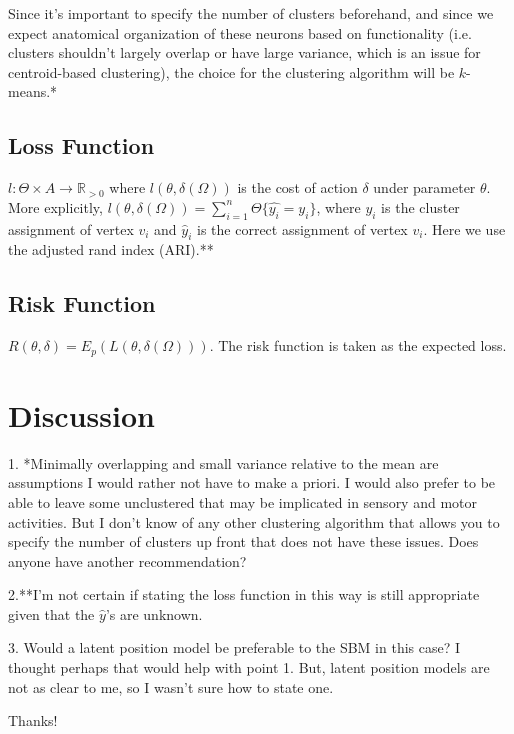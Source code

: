 \documentclass[psamsfonts]{amsart}
\theoremstyle{definition}
\theoremstyle{remark}
\numberwithin{equation}{section}
\begin{document}
Since it's important to specify the number of clusters beforehand, and since we expect anatomical organization of these neurons based on functionality (i.e. clusters shouldn't largely overlap or have large variance, which is an issue for centroid-based clustering), the choice for the clustering algorithm will be $k$-means.* 
\subsection{Loss Function}
$l : \Theta \times A \to \mathbb R_{> 0} $ where $l(\theta,\delta(\Omega))$ is the cost of action $\delta$ under parameter $\theta$. More explicitly, $l(\theta, \delta(\Omega)) = \sum_{i = 1}^n \Theta \{\hat{y_i} = y_i\}$, where $y_i$ is the cluster assignment of vertex $v_i$ and $\hat{y}_i$ is the correct assignment of vertex $v_i$. Here we use the adjusted rand index (ARI).**
\subsection{Risk Function}
$R(\theta, \delta) = E_{p}(L(\theta,\delta(\Omega)))$. The risk function is taken as the expected loss.


\section{Discussion}
1. *Minimally overlapping and small variance relative to the mean are assumptions I would rather not have to make a priori. I would also prefer to be able to leave some unclustered that may be implicated in sensory and motor activities. But I don't know of any other clustering algorithm that allows you to specify the number of clusters up front that does not have these issues. Does anyone have another recommendation?

2.**I'm not certain if stating the loss function in this way is still appropriate given that the $\hat{y}$'s are unknown. 

3. Would a latent position model be preferable to the SBM in this case? I thought perhaps that would help with point 1. But, latent position models are not as clear to me, so I wasn't sure how to state one. 

Thanks!

 
 
\end{document}
